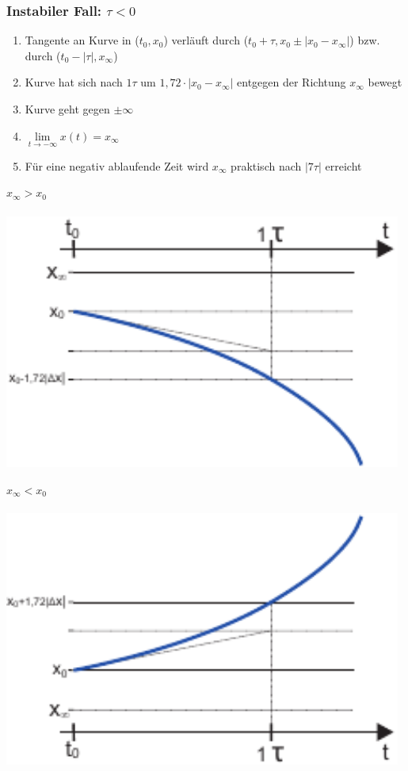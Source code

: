 \documentclass[a4paper,twocolumn,10pt]{article}
\begin{document}
\subsubsection*{Instabiler Fall: $\tau<0$}
\begin{enumerate}[label=-,leftmargin=3mm]
	\item Tangente an Kurve in ($t_0,x_0$) verläuft durch ($t_0+\tau,x_0\pm |x_0-x_\infty|$) bzw. durch ($t_0-|\tau|,x_\infty$)
	\item Kurve hat sich nach $1\tau$ um $1,72\cdot |x_0-x_\infty|$ entgegen der Richtung $x_\infty$ bewegt
	\item Kurve geht gegen $\pm \infty$
	\item $\lim\limits_{t\rightarrow -\infty} x(t)=x_\infty$
	\item Für eine negativ ablaufende Zeit wird $x_\infty$ praktisch nach $|7\tau|$ erreicht
\end{enumerate}
\begin{minipage}[t]{0.23\textwidth}
$x_\infty > x_0$\\\\
\includegraphics[width=0.98\textwidth]{img/Zeitverlauf3}\\
\end{minipage}
\hfill
\begin{minipage}[t]{0.23\textwidth}
$x_\infty < x_0$\\\\
\includegraphics[width=0.98\textwidth]{img/Zeitverlauf4}\\
\end{minipage}
\end{document}
